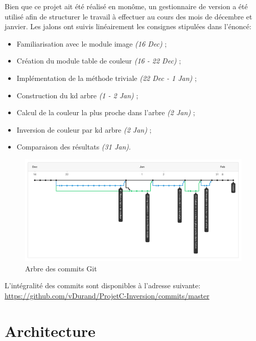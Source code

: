 \documentclass[a4paper,11pt,final]{article}
\begin{document}
Bien que ce projet ait été réalisé en monôme, un gestionnaire de version a été utilisé afin de structurer le travail à effectuer au cours des mois de décembre et janvier. Les jalons ont suivis linéairement les consignes stipulées dans l’énoncé:
\begin{itemize}
\item Familiarisation avec le module image \emph{(16 Dec)} ;
\item Création du module table de couleur \emph{(16 - 22 Dec)} ;
\item Implémentation de la méthode triviale \emph{(22 Dec - 1 Jan)} ;
\item Construction du kd arbre \emph{(1 - 2 Jan)} ;
\item Calcul de la couleur la plus proche dans l’arbre \emph{(2 Jan)} ;
\item Inversion de couleur par kd arbre \emph{(2 Jan)} ;
\item Comparaison des résultats \emph{(31 Jan)}.
\end{itemize}

\begin{figure}[ht!]
	\centering
	\includegraphics[width=150mm]{./pic/gitTree.jpg}
	\caption{Arbre des commits Git}
\end{figure}

L’intégralité des commits sont disponibles à l’adresse suivante: \url{https://github.com/vDurand/ProjetC-Inversion/commits/master}

\section{Architecture}
\end{document}
